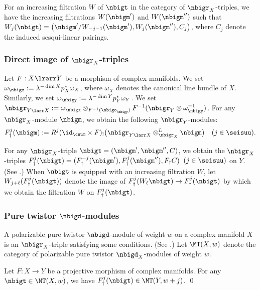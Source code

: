 \documentclass[a4,10pt]{article}
\begin{document}
For an increasing filtration $W$ of $\nbigt$ 
in the category of $\nbigr_X$-triples,
we have the increasing filtrations
$W(\nbigm')$ and $W(\nbigm'')$
such that
$W_j(\nbigt)=\bigl(
 \nbigm'/W_{-j-1}(\nbigm'),
 W_j(\nbigm''),C_j
\bigr)$,
where $C_j$ denote the induced sesqui-linear pairings.


\subsubsection{Direct image of $\nbigr_X$-triples}

Let $F:X\lrarr Y$ be a morphism of complex manifolds.
We set $\omega_{\nbigx}:=\lambda^{-\dim X}p_X^{\ast}\omega_{X}$,
where $\omega_X$ denotes the canonical line bundle of $X$.
Similarly, we set
$\omega_{\nbigy}:=\lambda^{-\dim Y}p_Y^{\ast}\omega_Y$.
We set
$\nbigr_{Y\larr X}:=
 \omega_{\nbigx}\otimes_{F^{-1}(\nbigo_{\nbigy})}
 F^{-1}(\nbigr_{Y}\otimes\omega_{\nbigy}^{-1})$. 
For any $\nbigr_{X}$-module $\nbigm$,
we obtain the following $\nbigr_{Y}$-modules:
\[
 F^j_{\dagger}(\nbigm):=
 R^j(\id_{\cnum}\times F)_{!}
 \bigl(
  \nbigr_{Y\larr X}\otimes^L_{\nbigr_{X}}
  \nbigm
  \bigr)
  \quad
  (j\in\seisuu).
\]

For any $\nbigr_X$-triple $\nbigt=(\nbigm',\nbigm'',C)$,
we obtain the $\nbigr_X$-triples
$F_{\dagger}^j(\nbigt)
=(F_{\dagger}^{-j}(\nbigm'),F_{\dagger}^j(\nbigm''),F_{\dagger}C)$
$(j\in\seisuu)$ on $Y$.
(See \cite[\S1.4]{Sabbah-pure-twistor}.)
When $\nbigt$ is equipped with an increasing filtration $W$,
let
$W_{j+\ell}(F_{\dagger}^j(\nbigt))$
denote the image of
$F_{\dagger}^j(W_{\ell}\nbigt)
\to F_{\dagger}^j(\nbigt)$
by which we obtain the filtration $W$
on $F_{\dagger}^j(\nbigt)$.


\subsubsection{Pure twistor $\nbigd$-modules}

A polarizable pure twistor $\nbigd$-module of weight $w$
on a complex manifold $X$
is an $\nbigr_X$-triple satisfying some conditions.
(See \cite{Sabbah-wild-twistor,Mochizuki-wild}.)
Let $\MT(X,w)$ denote the category of
polarizable pure twistor $\nbigd_X$-modules of weight $w$.

\begin{thm}
\label{thm;25.6.28.1}
Let $F:X\to Y$ be a projective morphism of complex manifolds.
For any $\nbigt\in\MT(X,w)$,
we have $F^j_{\dagger}(\nbigt)\in \MT(Y,w+j)$.
\hfill\qed
\end{thm}
\end{document}
